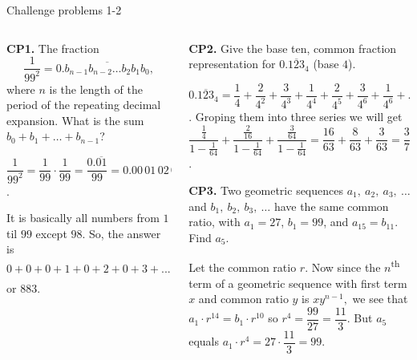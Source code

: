 \documentclass[9pt,aspectratio=169]{beamer}
\begin{document}
\begin{frame}{Challenge problems 1-2}
  \begin{columns}[T]
    \begin{column}{0.5\textwidth}
      \begin{problem}
        \textbf{CP1.} The fraction
        \[
        \frac{1}{99^2} = 0.\overline{b_{n−1}b_{n−2} \ldots b_2b_1b_0},
        \]
        where $n$ is the length of the period of the repeating decimal expansion. What is the sum $b_0 + b_1 + \ldots + b_{n−1}$?
      \end{problem}
      $\dfrac{1}{99^2} =\dfrac{1}{99} \cdot \dfrac{1}{99}=\dfrac{0.\overline{01}}{99}=0.\overline{00\,01\,02\,03\ldots 97\,99}$.

      It is basically all numbers from $1$ til $99$ except $98$.
      So, the answer is $0+0+0+1+0+2+0+3+...+9+7+9+9=2\cdot10\cdot\dfrac{9\cdot10}{2}-(9+8)$ or $\boxed{883}$.
    \end{column}
    \begin{column}{0.5\textwidth}
      \begin{problem}
        \textbf{CP2.} Give the base ten, common fraction representation for $0.\overline{123}_4$ (base $4$).
      \end{problem}
      $0.\overline{123}_{4} = \dfrac{1}{4} + \dfrac{2}{4^2} + \dfrac{3}{4^3} + \dfrac{1}{4^4} + \dfrac{2}{4^5} + \dfrac{3}{4^6} + \dfrac{1}{4^6} + \ldots$. Groping them into three series we will get
      $\dfrac{\frac{1}{4}}{1 - \frac{1}{64}} + \dfrac{\frac{2}{16}}{1 - \frac{1}{64}} + \dfrac{\frac{3}{64}}{1 - \frac{1}{64}} = \dfrac{16}{63} + \dfrac{8}{63} + \dfrac{3}{63} = \boxed{\dfrac{3}{7}}$.  
      \begin{problem}
        \textbf{CP3.} Two geometric sequences $a_1,\ a_2,\ a_3,\ \ldots$ and $b_1,\ b_2,\ b_3,\ \ldots$ have the same common ratio, with $a_1 = 27$, $b_1=99$, and $a_{15}=b_{11}$. Find $a_5$.
      \end{problem}

      Let the common ratio $r.$ Now since the $n$\textsuperscript{th} term of a geometric sequence with first term $x$ and common ratio $y$ is $xy^{n-1},$ we see that $a_1 \cdot r^{14} = b_1 \cdot r^{10}$ so $r^4 = \dfrac{99}{27} = \dfrac{11}{3}.$ But $a_5$ equals $a_1 \cdot r^4 = 27\cdot \dfrac{11}{3} = \boxed{99}$.
    \end{column}
  \end{columns}
\end{frame}
\end{document}
